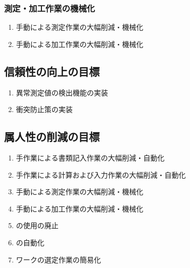 \subsubsection{測定・加工作業の機械化}
\begin{enumerate}[label=\sarrow]
\item 手動による測定作業の大幅削減・機械化
\item 手動による加工作業の大幅削減・機械化
\end{enumerate}


\subsection{信頼性の向上の目標}
\begin{enumerate}[label=\sarrow]
\item 異常測定値の検出機能の実装
\item 衝突防止策の実装
\end{enumerate}


\subsection{属人性の削減の目標}
\begin{enumerate}[label=\sarrow]
\item 手作業による書類記入作業の大幅削減・自動化
\item 手作業による計算および入力作業の大幅削減・自動化
\item 手動による測定作業の大幅削減・機械化
\item 手動による加工作業の大幅削減・機械化
\item \Spacer の使用の廃止
\item \CurvedOutcutMilling の自動化
\item ワーク\FixtureBolt の選定作業の簡易化
\end{enumerate}



